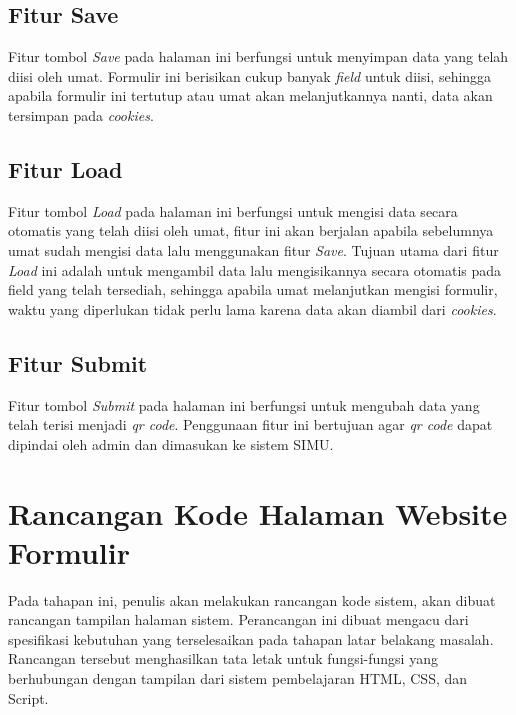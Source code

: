 \newpage

\subsection{Fitur Save}
\label{sec:save}

Fitur tombol \textit{Save} pada halaman ini berfungsi untuk menyimpan data yang telah diisi oleh umat. Formulir ini berisikan cukup banyak \textit{field} untuk diisi, sehingga apabila formulir ini tertutup atau umat akan melanjutkannya nanti, data akan tersimpan pada \textit{cookies}.

\subsection{Fitur Load}
\label{sec:load}

Fitur tombol \textit{Load} pada halaman ini berfungsi untuk mengisi data secara otomatis yang telah diisi oleh umat, fitur ini akan berjalan apabila sebelumnya umat sudah mengisi data lalu menggunakan fitur \textit{Save}. Tujuan utama dari fitur \textit{Load} ini adalah untuk mengambil data lalu mengisikannya secara otomatis pada field yang telah tersediah, sehingga apabila umat melanjutkan mengisi formulir, waktu yang diperlukan tidak perlu lama karena data akan diambil dari \textit{cookies}.

\subsection{Fitur Submit}
\label{sec:submit}

Fitur tombol \textit{Submit} pada halaman ini berfungsi untuk mengubah data yang telah terisi menjadi \textit{qr code}. Penggunaan fitur ini bertujuan agar \textit{qr code} dapat dipindai oleh admin dan dimasukan ke sistem SIMU.

\section{Rancangan Kode Halaman Website Formulir}
\label{sec:rancanganKodeFormulir}

Pada tahapan ini, penulis akan melakukan rancangan kode sistem, akan dibuat rancangan tampilan halaman sistem. Perancangan ini dibuat mengacu dari spesifikasi kebutuhan yang terselesaikan pada tahapan latar belakang masalah. Rancangan tersebut menghasilkan tata letak untuk fungsi-fungsi yang berhubungan dengan tampilan dari sistem pembelajaran HTML, CSS, dan Script. 

